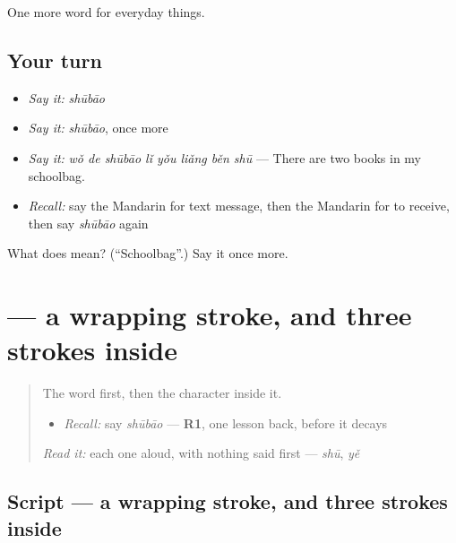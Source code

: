 \begin{grammarlens}[title={What you've built}]
One more word for everyday things.
\end{grammarlens}

\subsection*{Your turn}
\begin{itemize}
\raggedright
  \item \emph{Say it:} \emph{shūbāo}
  \item \emph{Say it:} \emph{shūbāo}, once more
  \item \emph{Say it:} \emph{wǒ de shūbāo lǐ yǒu liǎng běn shū} — There are two books in my schoolbag.
  \item \emph{Recall:} say the Mandarin for text message, then the Mandarin for to receive, then say \emph{shūbāo} again
\end{itemize}

\begin{tcolorbox}[breakable,colback=teal!4,colframe=teal!35!black,title={Before you move on}]
What does  mean? (\textquotedblleft{}Schoolbag\textquotedblright{}.) Say it once more.
\end{tcolorbox}
\section[\texorpdfstring{\zh{包} (bāo)}{包 (bāo)}]{ — a wrapping stroke, and three strokes inside}

\label{lesson:ZH-W119-bao-wrap}



\begin{quote}
The word first, then the character inside it.

\begin{itemize}
\raggedright
  \item \emph{Recall:} say \emph{shūbāo} — \textbf{R1}, one lesson back, before it decays
\end{itemize}

\begin{quote}
 
\end{quote}

\emph{Read it:} each one aloud, with nothing said first — \emph{shū}, \emph{yě}
\end{quote}

\subsection*{Script — a wrapping stroke, and three strokes inside}

